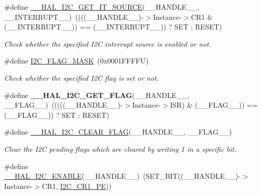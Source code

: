 \begin{DoxyCompactItemize}
\#define \mbox{\hyperlink{group___i2_c___exported___macros_ga932024bf4a259e0cdaf9e50b38e3d41a}{\+\_\+\+\_\+\+H\+A\+L\+\_\+\+I2\+C\+\_\+\+G\+E\+T\+\_\+\+I\+T\+\_\+\+S\+O\+U\+R\+CE}}(\+\_\+\+\_\+\+H\+A\+N\+D\+L\+E\+\_\+\+\_\+,  \+\_\+\+\_\+\+I\+N\+T\+E\+R\+R\+U\+P\+T\+\_\+\+\_\+)~((((\+\_\+\+\_\+\+H\+A\+N\+D\+L\+E\+\_\+\+\_\+)-\/$>$Instance-\/$>$C\+R1 \& (\+\_\+\+\_\+\+I\+N\+T\+E\+R\+R\+U\+P\+T\+\_\+\+\_\+)) == (\+\_\+\+\_\+\+I\+N\+T\+E\+R\+R\+U\+P\+T\+\_\+\+\_\+)) ? S\+ET \+: R\+E\+S\+ET)
\begin{DoxyCompactList}\small\item\em Check whether the specified I2C interrupt source is enabled or not. \end{DoxyCompactList}\item 
\#define \mbox{\hyperlink{group___i2_c___exported___macros_gafbc0a6e4113be03100fbae1314a8b395}{I2\+C\+\_\+\+F\+L\+A\+G\+\_\+\+M\+A\+SK}}~(0x0001\+F\+F\+F\+F\+U)
\begin{DoxyCompactList}\small\item\em Check whether the specified I2C flag is set or not. \end{DoxyCompactList}\item 
\mbox{\label{group___i2_c___exported___macros_gafbdf01a7dc3183de7af56456cab93551}} 
\#define {\bfseries \+\_\+\+\_\+\+H\+A\+L\+\_\+\+I2\+C\+\_\+\+G\+E\+T\+\_\+\+F\+L\+AG}(\+\_\+\+\_\+\+H\+A\+N\+D\+L\+E\+\_\+\+\_\+,  \+\_\+\+\_\+\+F\+L\+A\+G\+\_\+\+\_\+)~(((((\+\_\+\+\_\+\+H\+A\+N\+D\+L\+E\+\_\+\+\_\+)-\/$>$Instance-\/$>$I\+SR) \& (\+\_\+\+\_\+\+F\+L\+A\+G\+\_\+\+\_\+)) == (\+\_\+\+\_\+\+F\+L\+A\+G\+\_\+\+\_\+)) ? S\+ET \+: R\+E\+S\+ET)
\item 
\#define \mbox{\hyperlink{group___i2_c___exported___macros_ga933e2ea67e86db857a06b70a93be1186}{\+\_\+\+\_\+\+H\+A\+L\+\_\+\+I2\+C\+\_\+\+C\+L\+E\+A\+R\+\_\+\+F\+L\+AG}}(\+\_\+\+\_\+\+H\+A\+N\+D\+L\+E\+\_\+\+\_\+,  \+\_\+\+\_\+\+F\+L\+A\+G\+\_\+\+\_\+)
\begin{DoxyCompactList}\small\item\em Clear the I2C pending flags which are cleared by writing 1 in a specific bit. \end{DoxyCompactList}\item 
\#define \mbox{\hyperlink{group___i2_c___exported___macros_gacff412c47b0c1d63ef3b2a07f65988b7}{\+\_\+\+\_\+\+H\+A\+L\+\_\+\+I2\+C\+\_\+\+E\+N\+A\+B\+LE}}(\+\_\+\+\_\+\+H\+A\+N\+D\+L\+E\+\_\+\+\_\+)~(S\+E\+T\+\_\+\+B\+IT((\+\_\+\+\_\+\+H\+A\+N\+D\+L\+E\+\_\+\+\_\+)-\/$>$Instance-\/$>$C\+R1,  \mbox{\hyperlink{group___peripheral___registers___bits___definition_ga953b0d38414808db79da116842ed3262}{I2\+C\+\_\+\+C\+R1\+\_\+\+PE}}))

\end{DoxyCompactItemize}
